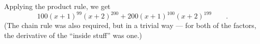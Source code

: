 Applying the product rule, we get
\begin{equation*}
  100(x+1)^{99}(x+2)^{200}+  200(x+1)^{100}(x+2)^{199} \qquad .
\end{equation*}
(The chain rule was also required, but in a trivial way --- for both of
the factors, the derivative of the ``inside stuff'' was one.)
